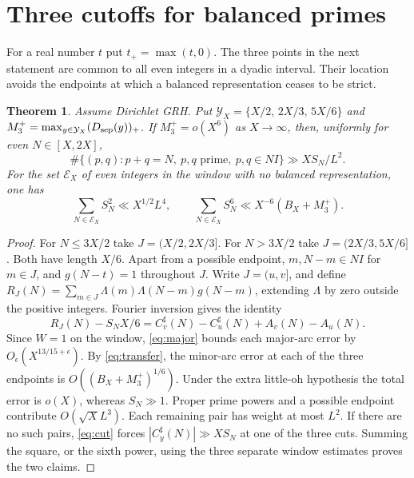 \documentclass[11pt,a4paper]{article}
\newtheorem{theorem}{Theorem}[section]\newtheorem{prop}[theorem]{Proposition}
\begin{document}
\section{Three cutoffs for balanced primes}\label{s:main}
For a real number \(t\) put \(t_+=\max(t,0)\). The three points in the next statement are common to all even integers in a dyadic interval. Their location avoids the endpoints at which a balanced representation ceases to be strict.
\begin{theorem}\label{t:main}
Assume Dirichlet GRH. Put \(\mathcal Y_X=\{X/2,\,2X/3,\,5X/6\}\) and \(M_3^+=\max_{y\in\mathcal Y_X}(D_{{\mathrm{sep}}}(y))_+\).
If \(M_3^+=o(X^6)\) as \(X\to\infty\), then, uniformly for even \(N\in[X,2X]\),
\[
 \#\{(p,q):p+q=N,\ p,q\text{ prime},\ p,q\in NI\}\gg XS_N/L^2 .
\]
For the set \(\mathcal E_X\) of even integers in the window with no balanced representation, one has
\[
 \sum_{N\in\mathcal E_X}S_N^2\ll X^{1/2}L^4,\qquad
 \sum_{N\in\mathcal E_X}S_N^6\ll X^{-6}(B_X+M_3^+).
\]
\end{theorem}
\begin{proof}
For \(N\le3X/2\) take \(J=(X/2,2X/3]\). For \(N>3X/2\) take \(J=(2X/3,5X/6]\). Both have length \(X/6\). Apart from a possible endpoint, \(m,N-m\in NI\) for \(m\in J\), and \(g(N-t)=1\) throughout \(J\). Write \(J=(u,v]\), and define \(R_J(N)=\sum_{m\in J}\Lambda(m)\Lambda(N-m)g(N-m)\), extending \(\Lambda\) by zero outside the positive integers. Fourier inversion gives the identity
\begin{equation}
 R_J(N)-S_N X/6=C_v^\sharp(N)-C_u^\sharp(N)+A_v(N)-A_u(N).
 \label{eq:cut}
\end{equation}
Since \(W=1\) on the window, \eqref{eq:major} bounds each major-arc error by \(O_\epsilon(X^{13/15+\epsilon})\). By \eqref{eq:transfer}, the minor-arc error at each of the three endpoints is \(O((B_X+M_3^+)^{1/6})\). Under the extra little-oh hypothesis the total error is \(o(X)\), whereas \(S_N\gg1\). Proper prime powers and a possible endpoint contribute \(O(\sqrt X L^3)\). Each remaining pair has weight at most \(L^2\). If there are no such pairs, \eqref{eq:cut} forces \(|C_y^\sharp(N)|\gg XS_N\) at one of the three cuts. Summing the square, or the sixth power, using the three separate window estimates proves the two claims.
\end{proof}
\end{document}
